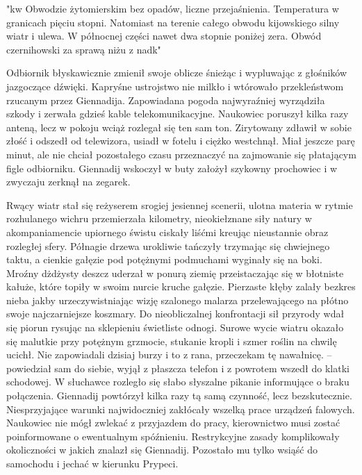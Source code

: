 \documentclass[../MAIN.tex]{subfiles}
\begin{document}
"\3kw Obwodzie żytomierskim bez opadów, liczne przejaśnienia. Temperatura w granicach pięciu stopni. Natomiast na terenie całego obwodu kijowskiego silny wiatr i ulewa. W północnej części nawet dwa stopnie poniżej zera. Obwód czernihowski za sprawą niżu z nad\3k" 

Odbiornik błyskawicznie zmienił swoje oblicze śnieżąc i wypluwając z głośników jazgoczące dźwięki. Kapryśne ustrojstwo nie milkło i wtórowało przekleństwom rzucanym przez Giennadija. Zapowiadana pogoda najwyraźniej wyrządziła szkody i zerwała gdzieś kable telekomunikacyjne. Naukowiec poruszył kilka razy anteną, lecz w pokoju wciąż rozlegał się ten sam ton. Zirytowany zdławił w sobie złość i odszedł od telewizora, usiadł w fotelu i ciężko westchnął. Miał jeszcze parę minut, ale nie chciał pozostałego czasu przeznaczyć na zajmowanie się płatającym figle odbiorniku. Giennadij wskoczył w buty założył szykowny prochowiec i w zwyczaju zerknął na zegarek. 

Rwący wiatr stał się reżyserem srogiej jesiennej scenerii, ulotna materia w rytmie rozhulanego wichru przemierzała kilometry, nieokiełznane siły natury w akompaniamencie upiornego świstu ciskały liśćmi kreując nieustannie obraz rozległej sfery. Półnagie drzewa urokliwie tańczyły trzymając się chwiejnego taktu, a cienkie gałęzie pod potężnymi podmuchami wyginały się na boki. Mroźny dżdżysty deszcz uderzał w ponurą ziemię przeistaczając się w błotniste kałuże, które topiły w swoim nurcie kruche gałęzie. Pierzaste kłęby zalały bezkres nieba jakby urzeczywistniając wizję szalonego malarza przelewającego na płótno swoje najczarniejsze koszmary. Do nieobliczalnej konfrontacji sił przyrody wdał się piorun rysując na sklepieniu świetliste odnogi. Surowe wycie wiatru okazało się malutkie przy potężnym grzmocie, stukanie kropli i szmer roślin na chwilę ucichł. 
% 
\sx Nie zapowiadali dzisiaj burzy i to z rana, przeczekam tę nawałnicę. -- powiedział sam do siebie, wyjął z płaszcza telefon i z powrotem wszedł do klatki schodowej. 
\qd
W słuchawce rozległo się słabo słyszalne pikanie informujące o braku połączenia. Giennadij powtórzył kilka razy tą samą czynność, lecz bezskutecznie. Niesprzyjające warunki najwidoczniej zakłócały wszelką prace urządzeń falowych. Naukowiec nie mógł zwlekać z przyjazdem do pracy, kierownictwo musi zostać poinformowane o ewentualnym spóźnieniu. Restrykcyjne zasady komplikowały okoliczności w jakich znalazł się Giennadij. Pozostało mu tylko wsiąść do samochodu i jechać w kierunku Prypeci. 
\end{document}
